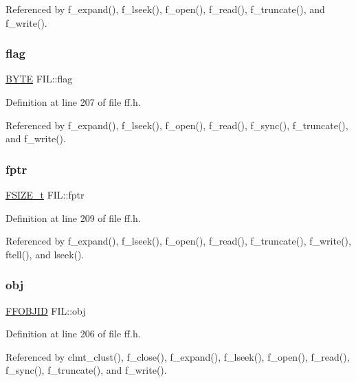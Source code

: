 Referenced by f\+\_\+expand(), f\+\_\+lseek(), f\+\_\+open(), f\+\_\+read(), f\+\_\+truncate(), and f\+\_\+write().

\mbox{\label{structFIL_ac409508881f5a16f2998ae675072b376}} 
\subsubsection{\texorpdfstring{flag}{flag}}
{\footnotesize\ttfamily \hyperlink{ff_8h_a4ae1dab0fb4b072a66584546209e7d58}{B\+Y\+TE} F\+I\+L\+::flag}



Definition at line 207 of file ff.\+h.



Referenced by f\+\_\+expand(), f\+\_\+lseek(), f\+\_\+open(), f\+\_\+read(), f\+\_\+sync(), f\+\_\+truncate(), and f\+\_\+write().

\mbox{\label{structFIL_a088b03ab2e02f82e10e17bdd938190a6}} 
\subsubsection{\texorpdfstring{fptr}{fptr}}
{\footnotesize\ttfamily \hyperlink{ff_8h_a3fc0992ad7436250b6b1a0592214b7f2}{F\+S\+I\+Z\+E\+\_\+t} F\+I\+L\+::fptr}



Definition at line 209 of file ff.\+h.



Referenced by f\+\_\+expand(), f\+\_\+lseek(), f\+\_\+open(), f\+\_\+read(), f\+\_\+truncate(), f\+\_\+write(), ftell(), and lseek().

\mbox{\label{structFIL_ad95b6e85106673b0d7a1855da4d264f4}} 
\subsubsection{\texorpdfstring{obj}{obj}}
{\footnotesize\ttfamily \hyperlink{structFFOBJID}{F\+F\+O\+B\+J\+ID} F\+I\+L\+::obj}



Definition at line 206 of file ff.\+h.



Referenced by clmt\+\_\+clust(), f\+\_\+close(), f\+\_\+expand(), f\+\_\+lseek(), f\+\_\+open(), f\+\_\+read(), f\+\_\+sync(), f\+\_\+truncate(), and f\+\_\+write().

